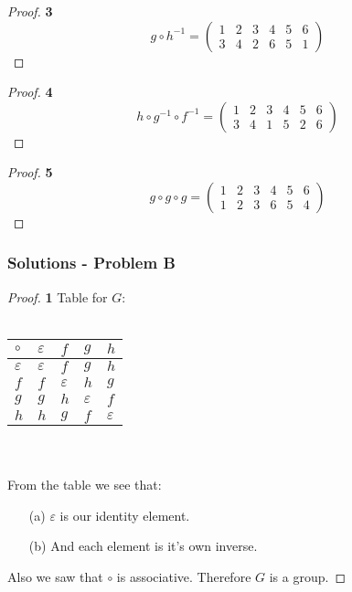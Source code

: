 \documentclass[11pt]{article}
\begin{document}
		\begin{proof}{\textbf{3}}
			\begin{equation*}
				g \circ h^{-1} =
				\begin{pmatrix}
					1 & 2 & 3 & 4 & 5 & 6 \\
					3 & 4 & 2 & 6 & 5 & 1
				\end{pmatrix}			
			\end{equation*}
		\end{proof}
		\begin{proof}{\textbf{4}}
			\begin{equation*}
				h \circ g^{-1} \circ f^{-1} =
				\begin{pmatrix}
					1 & 2 & 3 & 4 & 5 & 6 \\
					3 & 4 & 1 & 5 & 2 & 6
				\end{pmatrix}			
			\end{equation*}
		\end{proof}
		\begin{proof}{\textbf{5}}
			\begin{equation*}
				g \circ g \circ g =
				\begin{pmatrix}
					1 & 2 & 3 & 4 & 5 & 6 \\
					1 & 2 & 3 & 6 & 5 & 4
				\end{pmatrix}			
			\end{equation*}
		\end{proof}
	\subsubsection*{Solutions - Problem B}
		\newcommand{\ep}{$\varepsilon$ }
		\begin{proof}{\textbf{1}}
			Table for $G$:\\\\
				\begin{adjustbox}{max width=\textwidth,center}
				\begin{tabular}{l|llll}
				$\circ$ & \ep & $f$ & $g$ & $h$ \\ \hline
				\ep     & \ep & $f$ & $g$ & $h$ \\
				$f$     & $f$ & \ep & $h$ & $g$ \\
				$g$     & $g$ & $h$ & \ep & $f$ \\
				$h$     & $h$ & $g$ & $f$ & \ep \\
				\end{tabular}
				\end{adjustbox}\\\\
			From the table we see that:
				\begin{itemize}
				\item[(a)] \ep is our identity element.
				\item[(b)] And each element is it's own inverse.
				\end{itemize}							
			Also we saw that $\circ$ is associative. Therefore $G$ is a group.
		\end{proof}
\end{document}
